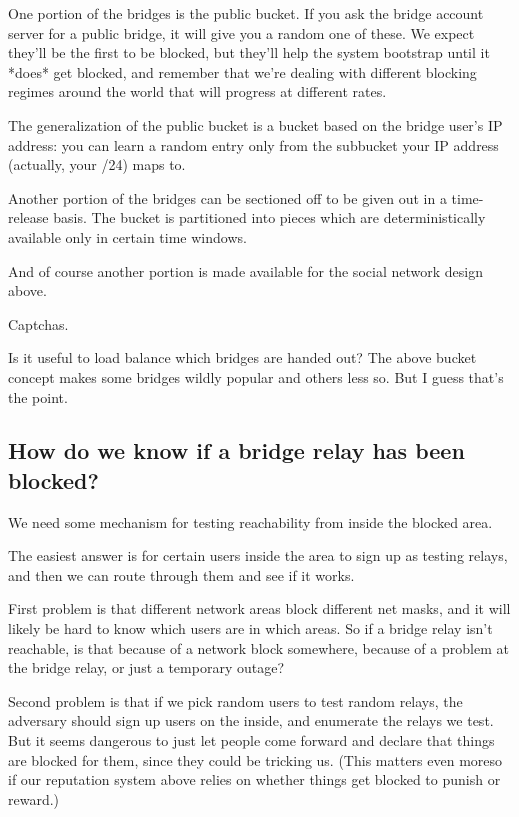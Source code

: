 \documentclass{llncs}
\begin{document}
One portion of the bridges is the public bucket. If you ask the
bridge account server for a public bridge, it will give you a random
one of these. We expect they'll be the first to be blocked, but they'll
help the system bootstrap until it *does* get blocked, and remember that
we're dealing with different blocking regimes around the world that will
progress at different rates.

The generalization of the public bucket is a bucket based on the bridge
user's IP address: you can learn a random entry only from the subbucket
your IP address (actually, your /24) maps to.

Another portion of the bridges can be sectioned off to be given out in
a time-release basis. The bucket is partitioned into pieces which are
deterministically available only in certain time windows.

And of course another portion is made available for the social network
design above.

Captchas.

Is it useful to load balance which bridges are handed out? The above
bucket concept makes some bridges wildly popular and others less so.
But I guess that's the point.

\subsection{How do we know if a bridge relay has been blocked?}

We need some mechanism for testing reachability from inside the
blocked area.

The easiest answer is for certain users inside the area to sign up as
testing relays, and then we can route through them and see if it works.

First problem is that different network areas block different net masks,
and it will likely be hard to know which users are in which areas. So
if a bridge relay isn't reachable, is that because of a network block
somewhere, because of a problem at the bridge relay, or just a temporary
outage?

Second problem is that if we pick random users to test random relays, the
adversary should sign up users on the inside, and enumerate the relays
we test. But it seems dangerous to just let people come forward and
declare that things are blocked for them, since they could be tricking
us. (This matters even moreso if our reputation system above relies on
whether things get blocked to punish or reward.)
\end{document}
